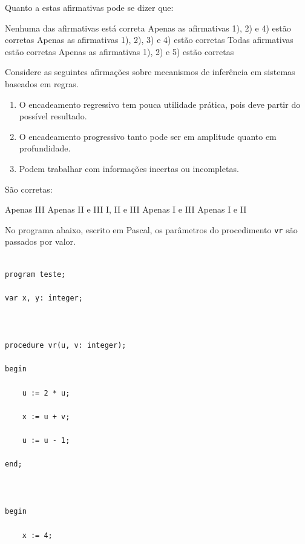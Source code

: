 \documentclass[12pt, addpoints]{exam}
\begin{document}
\begin{questions}
Quanto a estas afirmativas pode se dizer que:
\begin{choices}
\choice Nenhuma das afirmativas está correta
\choice Apenas as afirmativas 1), 2) e 4) estão corretas
\choice Apenas as afirmativas 1), 2), 3) e 4) estão corretas
\choice Todas afirmativas estão corretas
\choice Apenas as afirmativas 1), 2) e 5) estão corretas
\end{choices}

\question

Considere as seguintes afirmações sobre mecanismos de inferência em sistemas baseados em regras.

\begin{enumerate}[label=\Roman*.]

    \item O encadeamento regressivo tem pouca utilidade prática, pois deve partir do possível resultado.

    \item O encadeamento progressivo tanto pode ser em amplitude quanto em profundidade.

    \item Podem trabalhar com informações incertas ou incompletas. 

\end{enumerate}

São corretas:
\begin{choices}
\choice Apenas III
\choice Apenas II e III
\choice I, II e III
\choice Apenas I e III
\choice Apenas I e II
\end{choices}

\question

No programa abaixo, escrito em Pascal, os parâmetros do procedimento \texttt{vr} são passados por valor.



\begin{verbatim}

program teste;

var x, y: integer;



procedure vr(u, v: integer);

begin

    u := 2 * u;

    x := u + v;

    u := u - 1;

end;



begin

    x := 4;


\end{verbatim}
\end{questions}
\end{document}
